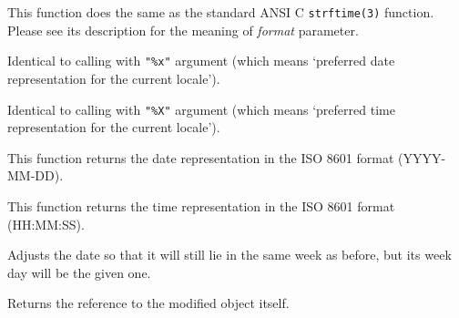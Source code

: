 \label{wxdatetimeformat}


This function does the same as the standard ANSI C {\tt strftime(3)} function.
Please see its description for the meaning of {\it format} parameter.



\label{wxdatetimeformatdate}


Identical to calling  with {\tt "\%x"} 
argument (which means `preferred date representation for the current locale').

\label{wxdatetimeformattime}


Identical to calling  with {\tt "\%X"} 
argument (which means `preferred time representation for the current locale').

\label{wxdatetimeformatisodate}


This function returns the date representation in the ISO 8601 format
(YYYY-MM-DD).

\label{wxdatetimeformatisotime}


This function returns the time representation in the ISO 8601 format
(HH:MM:SS).


\label{wxdatetimesettoweekdayinsameweek}


Adjusts the date so that it will still lie in the same week as before, but its
week day will be the given one.

Returns the reference to the modified object itself.

